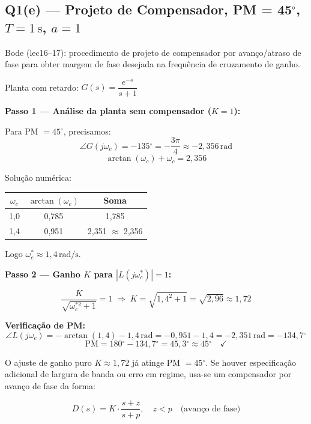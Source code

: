 \documentclass[12pt,a4paper]{article}
\newcommand{\degrees}{\ensuremath{^{\circ}}}
\begin{document}
\subsection*{Q1(e) — Projeto de Compensador, PM = 45\degrees{}, $T=1\,\mathrm{s}$, $a=1$}

\begin{metodo}
  Bode (lec16--17): procedimento de projeto de compensador por avanço/atraso
  de fase para obter margem de fase desejada na frequência de cruzamento de ganho.
\end{metodo}

Planta com retardo: $G(s) = \dfrac{e^{-s}}{s + 1}$

\textbf{Passo 1 — Análise da planta sem compensador ($K=1$):}

Para PM $= 45\degrees$, precisamos:
\[
  \angle G(j\omega_c) = -135\degrees = -\frac{3\pi}{4} \approx -2{,}356\,\text{rad}
\]
\[
  \arctan(\omega_c) + \omega_c = 2{,}356
\]

Solução numérica:
\begin{center}
\begin{tabular}{ccc}
\toprule
$\omega_c$ & $\arctan(\omega_c)$ & Soma \\
\midrule
1{,}0 & 0{,}785 & 1{,}785 \\
1{,}4 & 0{,}951 & 2{,}351 $\approx$ 2{,}356 \\
\bottomrule
\end{tabular}
\end{center}

Logo $\omega_c^* \approx 1{,}4\,\text{rad/s}$.

\textbf{Passo 2 — Ganho $K$ para $|L(j\omega_c^*)| = 1$:}

\[
  \frac{K}{\sqrt{\omega_c^{*2} + 1}} = 1
  \;\Rightarrow\;
  K = \sqrt{1{,}4^2 + 1} = \sqrt{2{,}96} \approx 1{,}72
\]

\textbf{Verificação de PM:}
\[
  \angle L(j\omega_c) = -\arctan(1{,}4) - 1{,}4\,\text{rad}
  = -0{,}951 - 1{,}4 = -2{,}351\,\text{rad} = -134{,}7\degrees
\]
\[
  \text{PM} = 180\degrees - 134{,}7\degrees = 45{,}3\degrees \approx 45\degrees \quad \checkmark
\]

O ajuste de ganho puro $K \approx 1{,}72$ já atinge PM $= 45\degrees$.
Se houver especificação adicional de largura de banda ou erro em regime,
usa-se um compensador por avanço de fase da forma:

\[
  D(s) = K \cdot \frac{s + z}{s + p}, \quad z < p \quad \text{(avanço de fase)}
\]
\end{document}
